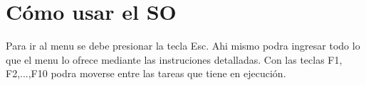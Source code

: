 \documentclass[a4paper,10pt]{article}
\begin{document}
\newpage
\section{C\'omo usar el SO}
Para ir al menu se debe presionar la tecla Esc. Ahi mismo podra ingresar todo lo que el menu lo ofrece mediante las instruciones detalladas.
Con las teclas F1, F2,...,F10 podra moverse entre las tareas que tiene en ejecución.
\end{document}
